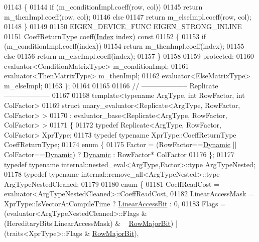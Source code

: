 \begin{DoxyCode}
01143 \textcolor{keyword}{  }\{
01144     \textcolor{keywordflow}{if} (m\_conditionImpl.coeff(row, col))
01145       \textcolor{keywordflow}{return} m\_thenImpl.coeff(row, col);
01146     \textcolor{keywordflow}{else}
01147       \textcolor{keywordflow}{return} m\_elseImpl.coeff(row, col);
01148   \}
01149 
01150   EIGEN\_DEVICE\_FUNC EIGEN\_STRONG\_INLINE
01151   CoeffReturnType coeff(\hyperlink{namespace_eigen_a62e77e0933482dafde8fe197d9a2cfde}{Index} index)\textcolor{keyword}{ const}
01152 \textcolor{keyword}{  }\{
01153     \textcolor{keywordflow}{if} (m\_conditionImpl.coeff(index))
01154       \textcolor{keywordflow}{return} m\_thenImpl.coeff(index);
01155     \textcolor{keywordflow}{else}
01156       \textcolor{keywordflow}{return} m\_elseImpl.coeff(index);
01157   \}
01158  
01159 \textcolor{keyword}{protected}:
01160   evaluator<ConditionMatrixType> m\_conditionImpl;
01161   evaluator<ThenMatrixType> m\_thenImpl;
01162   evaluator<ElseMatrixType> m\_elseImpl;
01163 \};
01164 
01165 
01166 \textcolor{comment}{// -------------------- Replicate --------------------}
01167 
01168 \textcolor{keyword}{template}<\textcolor{keyword}{typename} ArgType, \textcolor{keywordtype}{int} RowFactor, \textcolor{keywordtype}{int} ColFactor> 
01169 \textcolor{keyword}{struct }unary\_evaluator<Replicate<ArgType, RowFactor, ColFactor> >
01170   : evaluator\_base<Replicate<ArgType, RowFactor, ColFactor> >
01171 \{
01172   \textcolor{keyword}{typedef} Replicate<ArgType, RowFactor, ColFactor> XprType;
01173   \textcolor{keyword}{typedef} \textcolor{keyword}{typename} XprType::CoeffReturnType CoeffReturnType;
01174   \textcolor{keyword}{enum} \{
01175     Factor = (RowFactor==\hyperlink{namespace_eigen_ad81fa7195215a0ce30017dfac309f0b2}{Dynamic} || ColFactor==\hyperlink{namespace_eigen_ad81fa7195215a0ce30017dfac309f0b2}{Dynamic}) ? \hyperlink{namespace_eigen_ad81fa7195215a0ce30017dfac309f0b2}{Dynamic} : RowFactor*
      ColFactor
01176   \};
01177   \textcolor{keyword}{typedef} \textcolor{keyword}{typename} internal::nested\_eval<ArgType,Factor>::type ArgTypeNested;
01178   \textcolor{keyword}{typedef} \textcolor{keyword}{typename} internal::remove\_all<ArgTypeNested>::type ArgTypeNestedCleaned;
01179   
01180   \textcolor{keyword}{enum} \{
01181     CoeffReadCost = evaluator<ArgTypeNestedCleaned>::CoeffReadCost,
01182     LinearAccessMask = XprType::IsVectorAtCompileTime ? \hyperlink{group__flags_ga4b983a15d57cd55806df618ac544d09e}{LinearAccessBit} : 0,
01183     Flags = (evaluator<ArgTypeNestedCleaned>::Flags & (HereditaryBits|LinearAccessMask) & ~
      \hyperlink{group__flags_gae4f56c2a60bbe4bd2e44c5b19cbe8762}{RowMajorBit}) | (traits<XprType>::Flags & \hyperlink{group__flags_gae4f56c2a60bbe4bd2e44c5b19cbe8762}{RowMajorBit}),

\end{DoxyCode}
